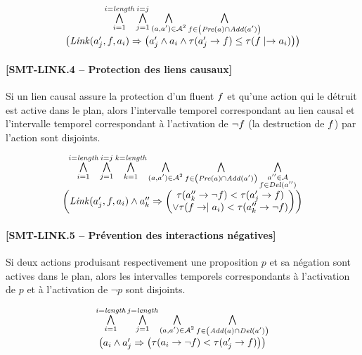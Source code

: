 \[
\begin{matrix}
\bigwedge\limits_{\substack{i=1}}^{i=\textit{length}} \bigwedge\limits_{\substack{j=1}}^{i=j} \bigwedge\limits_{\substack{(a,a')\in\mathcal{A}^{2}}} \bigwedge\limits_{\substack{f\in\left(\mathit{Pre}(a)\cap\mathit{Add}(a')\right)}}\\ \left( \mathit{Link}(a'_{j},f,a_{i}) \Rightarrow \left( a'_{j} \wedge a_{i} \wedge \tau(a'_{j}\rightarrow f) \leq \tau(f\mid\rightarrow a_{i}) \right) \right)
\end{matrix}
\]

\paragraph*{[SMT-LINK.4 -- Protection des liens causaux]}

Si un lien causal assure la protection d’un fluent $f$ et qu'une action qui le détruit est active dans le plan, alors l’intervalle temporel correspondant au lien causal et l’intervalle temporel correspondant à l’activation de $\neg f$ (la destruction de $f$) par l’action sont disjoints.

\[
\begin{matrix}
\bigwedge\limits_{\substack{i=1}}^{i=\textit{length}} \bigwedge\limits_{\substack{j=1}}^{i=j} \bigwedge\limits_{\substack{k=1}}^{k=\textit{length}} \bigwedge\limits_{\substack{(a,a')\in\mathcal{A}^{2}}} \bigwedge\limits_{\substack{f\in\left(\mathit{Pre}(a)\cap\mathit{Add}(a')\right)}} \bigwedge\limits_{\substack{a''\in\mathcal{A}\\f\in\mathit{Del}(a'')}}\\ \left( \mathit{Link}(a'_{j},f,a_{i}) \wedge a''_{k} \Rightarrow \left( \begin{matrix} \tau(a''_{k}\rightarrow\neg f) < \tau(a'_{j}\rightarrow f)\\ \vee \tau(f\rightarrow\mid a_{i}) < \tau(a''_{k}\rightarrow\neg f) \end{matrix} \right) \right)
\end{matrix}
\]

\paragraph*{[SMT-LINK.5 -- Prévention des interactions négatives]}

Si deux actions produisant respectivement une proposition $p$ et sa négation sont actives dans le plan, alors les intervalles temporels correspondants à l’activation de $p$ et à l’activation de $\neg p$ sont disjoints.

\[
\begin{matrix}
\BigforallTwo{i=1}{i=\length} \BigforallTwo{j=1}{j=\length} \Bigforall{(\a,\b)\in\A^{2}} \Bigforall{\f\in\left(\Add{\a}\cap\Del{\b}\right)}\\ \left( \a_{i} \wedge \b_{j} \Rightarrow \left( \begin{matrix} \tau(\a_{i}\rightarrow\neg\f) < \tau(\b_{j}\rightarrow\f)%
\end{matrix} \right) \right)
\end{matrix}
\]

